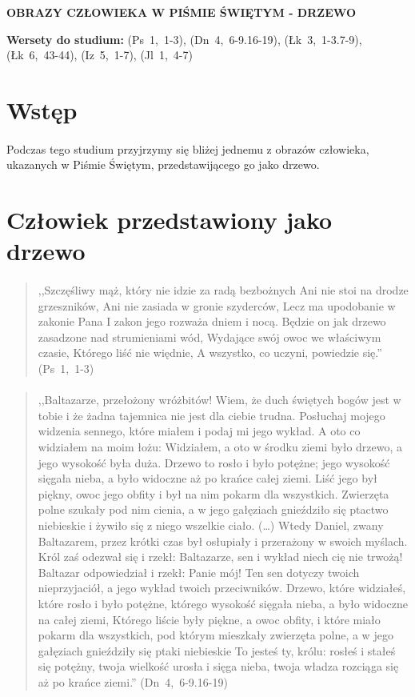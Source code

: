 \documentclass[10pt,a4paper,oneside]{article}
\begin{document}
\centerline{\textbf{\MakeUppercase{Obrazy człowieka w Piśmie Świętym - drzewo}}}
\begin{center}
\textbf{Wersety do studium:} 
\mbox{(Ps 1, 1-3)}, \mbox{(Dn 4, 6-9.16-19)}, \mbox{(Łk 3, 1-3.7-9)}, \mbox{(Łk 6, 43-44)}, \mbox{(Iz 5, 1-7)}, \mbox{(Jl 1, 4-7)}
\end{center}
\section{Wstęp}
\paragraph{}
Podczas tego studium przyjrzymy się bliżej jednemu z obrazów człowieka, ukazanych w Piśmie Świętym, przedstawijącego go jako drzewo.
\section{Człowiek przedstawiony jako drzewo}
\paragraph{}
\begin{quote}
,,Szczęśliwy mąż, który nie idzie za radą bezbożnych Ani nie stoi na drodze grzeszników, Ani nie zasiada w gronie szyderców, Lecz ma upodobanie w zakonie Pana I zakon jego rozważa dniem i nocą. Będzie on jak drzewo zasadzone nad strumieniami wód, Wydające swój owoc we właściwym czasie, Którego liść nie więdnie, A wszystko, co uczyni, powiedzie się.'' \mbox{(Ps 1, 1-3)}
\end{quote}
\paragraph{}
\begin{quote}
,,Baltazarze, przełożony wróżbitów! Wiem, że duch świętych bogów jest w tobie i że żadna tajemnica nie jest dla ciebie trudna. Posłuchaj mojego widzenia sennego, które miałem i podaj mi jego wykład. A oto co widziałem na moim łożu: Widziałem, a oto w środku ziemi było drzewo, a jego wysokość była duża. Drzewo to rosło i było potężne; jego wysokość sięgała nieba, a było widoczne aż po krańce całej ziemi. Liść jego był piękny, owoc jego obfity i był na nim pokarm dla wszystkich. Zwierzęta polne szukały pod nim cienia, a w jego gałęziach gnieździło się ptactwo niebieskie i żywiło się z niego wszelkie ciało. (\ldots) Wtedy Daniel, zwany Baltazarem, przez krótki czas był osłupiały i przerażony w swoich myślach. Król zaś odezwał się i rzekł: Baltazarze, sen i wykład niech cię nie trwożą! Baltazar odpowiedział i rzekł: Panie mój! Ten sen dotyczy twoich nieprzyjaciół, a jego wykład twoich przeciwników. Drzewo, które widziałeś, które rosło i było potężne, którego wysokość sięgała nieba, a było widoczne na całej ziemi, Którego liście były piękne, a owoc obfity, i które miało pokarm dla wszystkich, pod którym mieszkały zwierzęta polne, a w jego gałęziach gnieździły się ptaki niebieskie To jesteś ty, królu: rosłeś i stałeś się potężny, twoja wielkość urosła i sięga nieba, twoja władza rozciąga się aż po krańce ziemi.'' \mbox{(Dn 4, 6-9.16-19)}
\end{quote}
\end{document}
